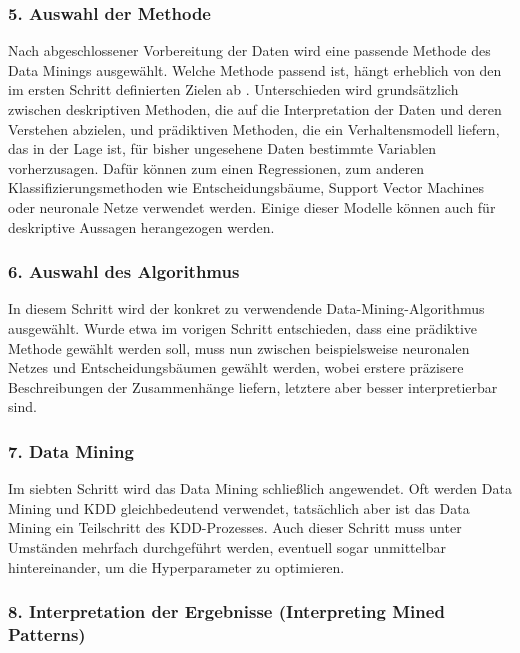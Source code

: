 \subsubsection{5. Auswahl der Methode} %

Nach abgeschlossener Vorbereitung der Daten wird eine passende Methode des Data Minings ausgewählt. Welche Methode passend ist, hängt erheblich von den im ersten Schritt definierten Zielen ab \cite{Fayyad:1996}. Unterschieden wird grundsätzlich zwischen deskriptiven Methoden, die auf die Interpretation der Daten und deren Verstehen abzielen, und prädiktiven Methoden, die ein Verhaltensmodell liefern, das in der Lage ist, für bisher ungesehene Daten bestimmte Variablen vorherzusagen. Dafür können zum einen Regressionen, zum anderen Klassifizierungsmethoden wie Entscheidungsbäume, Support Vector Machines oder neuronale Netze verwendet werden. Einige dieser Modelle können auch für deskriptive Aussagen herangezogen werden. \cite{Maimon:2010}

\subsubsection{6. Auswahl des Algorithmus} %

In diesem Schritt wird der konkret zu verwendende Data-Mining-Algorithmus ausgewählt. Wurde etwa im vorigen Schritt entschieden, dass eine prädiktive Methode gewählt werden soll, muss nun zwischen beispielsweise neuronalen Netzes und Entscheidungsbäumen gewählt werden, wobei erstere präzisere Beschreibungen der Zusammenhänge liefern, letztere aber besser interpretierbar sind. \cite{Maimon:2010}

\subsubsection{7. Data Mining}

Im siebten Schritt wird das Data Mining schließlich angewendet. Oft werden Data Mining und KDD gleichbedeutend verwendet, tatsächlich aber ist das Data Mining ein Teilschritt des KDD-Prozesses. \cite{Fayyad:1996}
Auch dieser Schritt muss unter Umständen mehrfach durchgeführt werden, eventuell sogar unmittelbar hintereinander, 
um die Hyperparameter zu optimieren. \cite{Maimon:2010}

\subsubsection{8. Interpretation der Ergebnisse (Interpreting Mined Patterns)}

